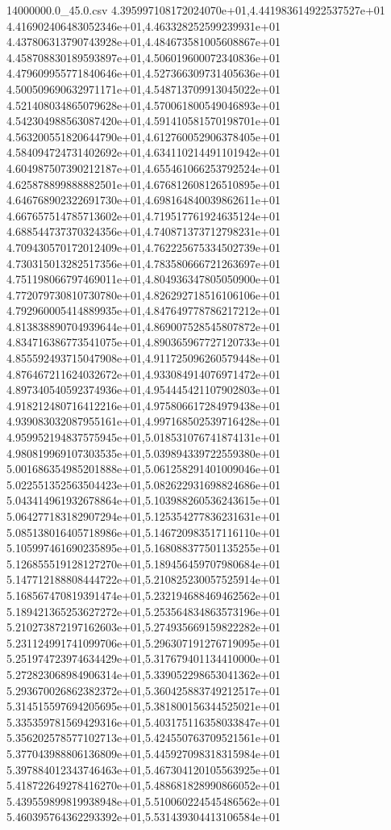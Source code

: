 \begin{filecontents*}{14000000.0_45.0.csv}
4.395997108172024070e+01,4.441983614922537527e+01
4.416902406483052346e+01,4.463328252599239931e+01
4.437806313790743928e+01,4.484673581005608867e+01
4.458708830189593897e+01,4.506019600072340836e+01
4.479609955771840646e+01,4.527366309731405636e+01
4.500509690632971171e+01,4.548713709913045022e+01
4.521408034865079628e+01,4.570061800549046893e+01
4.542304988563087420e+01,4.591410581570198701e+01
4.563200551820644790e+01,4.612760052906378405e+01
4.584094724731402692e+01,4.634110214491101942e+01
4.604987507390212187e+01,4.655461066253792524e+01
4.625878899888882501e+01,4.676812608126510895e+01
4.646768902322691730e+01,4.698164840039862611e+01
4.667657514785713602e+01,4.719517761924635124e+01
4.688544737370324356e+01,4.740871373712798231e+01
4.709430570172012409e+01,4.762225675334502739e+01
4.730315013282517356e+01,4.783580666721263697e+01
4.751198066797469011e+01,4.804936347805050900e+01
4.772079730810730780e+01,4.826292718516106106e+01
4.792960005414889935e+01,4.847649778786217212e+01
4.813838890704939644e+01,4.869007528545807872e+01
4.834716386773541075e+01,4.890365967727120733e+01
4.855592493715047908e+01,4.911725096260579448e+01
4.876467211624032672e+01,4.933084914076971472e+01
4.897340540592374936e+01,4.954445421107902803e+01
4.918212480716412216e+01,4.975806617284979438e+01
4.939083032087955161e+01,4.997168502539716428e+01
4.959952194837575945e+01,5.018531076741874131e+01
4.980819969107303535e+01,5.039894339722559380e+01
5.001686354985201888e+01,5.061258291401009046e+01
5.022551352563504423e+01,5.082622931698824686e+01
5.043414961932678864e+01,5.103988260536243615e+01
5.064277183182907294e+01,5.125354277836231631e+01
5.085138016405718986e+01,5.146720983517116110e+01
5.105997461690235895e+01,5.168088377501135255e+01
5.126855519128127270e+01,5.189456459707980684e+01
5.147712188808444722e+01,5.210825230057525914e+01
5.168567470819391474e+01,5.232194688469462562e+01
5.189421365253627272e+01,5.253564834863573196e+01
5.210273872197162603e+01,5.274935669159822282e+01
5.231124991741099706e+01,5.296307191276719095e+01
5.251974723974634429e+01,5.317679401134410000e+01
5.272823068984906314e+01,5.339052298653041362e+01
5.293670026862382372e+01,5.360425883749212517e+01
5.314515597694205695e+01,5.381800156344525021e+01
5.335359781569429316e+01,5.403175116358033847e+01
5.356202578577102713e+01,5.424550763709521561e+01
5.377043988806136809e+01,5.445927098318315984e+01
5.397884012343746463e+01,5.467304120105563925e+01
5.418722649278416270e+01,5.488681828990866052e+01
5.439559899819938948e+01,5.510060224545486562e+01
5.460395764362293392e+01,5.531439304413106584e+01

\end{filecontents*}
